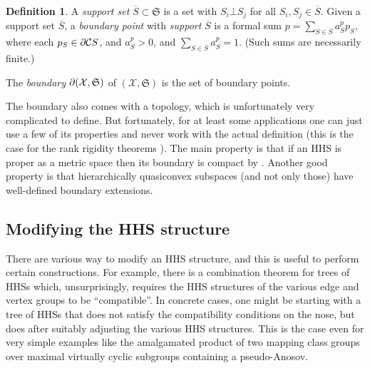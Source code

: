 \documentclass[11pt,oneside]{amsart}
\newcounter{ax}
\theoremstyle{definition}
\newtheorem{defn}[thm]{Definition}
\newcommand{\boundary}{{\ensuremath \partial}}
\newcommand{\cuco}[1]{{\mathcal #1}}
\newcommand{\fontact}{{\mathcal C}}
\newcommand{\orth}{\bot}
\begin{document}
\begin{defn}\label{defn:boundary_point}\cite[Definitions 2.2-2.3]{HHS_boundary}
A \emph{support set} $\overline S\subset\mathfrak S$ is a set with $S_i\orth S_j$ for all $S_i,S_j\in\overline S$.  Given a support set $\overline S$, a \emph{boundary point} with \emph{support} $\overline S$ is a formal sum $p=\sum_{S\in\overline S}a^p_Sp_S$, where each $p_S\in\boundary\fontact S$, and $a^p_S>0$, and $\sum_{S\in\overline S}a^p_S=1$.  (Such sums are necessarily finite.)

The \emph{boundary} $\boundary(\cuco X,\mathfrak S)$ of $(\cuco X,\mathfrak S)$ is the set of boundary points.
\end{defn}

The boundary also comes with a topology, which is unfortunately very complicated to define. But fortunately, for at least some applications one can just use a few of its properties and never work with the actual definition (this is the case for the rank rigidity theorems \cite[Theorems 9.13,914]{HHS_boundary}). The main property is that if an HHS is proper as a metric space then its boundary is compact by \cite[Theorem 3.4]{HHS_boundary}. Another good property is that hierarchically quasiconvex subspaces (and not only those) have well-defined boundary extensions.





\subsection{Modifying the HHS structure}

There are various way to modify an HHS structure, and this is useful to perform certain constructions. For example, there is a combination theorem for trees of HHSs which, unsurprisingly, requires the HHS structures of the various edge and vertex groups to be ``compatible''. In concrete cases, one might be starting with a tree of HHSs that does not satisfy the compatibility conditions on the nose, but does after suitably adjusting the various HHS structures. This is the case even for very simple examples like the amalgamated product of two mapping class groups over maximal virtually cyclic subgroups containing a pseudo-Anosov.
\end{document}
